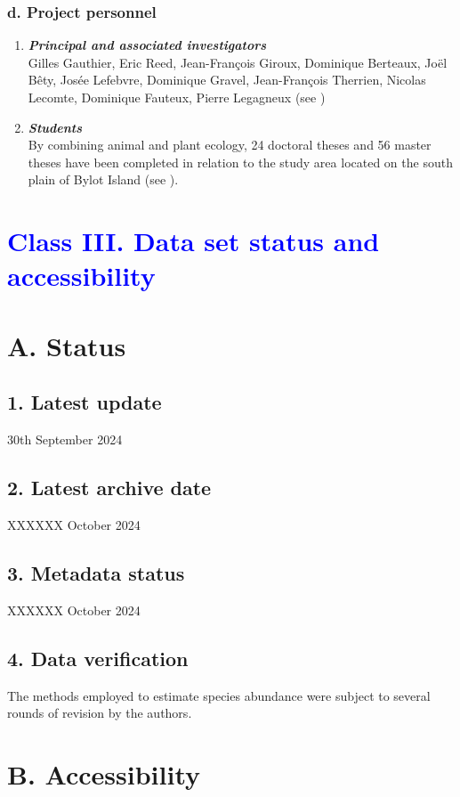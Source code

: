 \documentclass[a4paper,twoside,12pt]{article}
\begin{document}
                \subsubsection*{d. Project personnel}
                \begin{enumerate}[label=\alph*.]
                        \item[] \textit{\textbf{Principal and associated investigators}}\\
                        Gilles Gauthier, Eric Reed, Jean-François Giroux, Dominique Berteaux, Joël Bêty, Josée Lefebvre, Dominique Gravel, Jean-François Therrien, Nicolas Lecomte, Dominique Fauteux, Pierre Legagneux (see \citet{gauthier2024b})
                        \item[] \textit{\textbf{Students}}\\
                        By combining animal and plant ecology, 24 doctoral theses and 56 master theses have been completed in relation to the study area located on the south plain of Bylot Island (see \citet{gauthier2024b}).
                \end{enumerate}
\newpage 
 \section*{\textcolor{Blue}{Class III. Data set status and accessibility}}
    \section*{A. Status}
                \subsection*{1. Latest update} 30th September 2024
        \subsection*{2. Latest archive date} XXXXXX October 2024
        \subsection*{3. Metadata status} XXXXXX October 2024
        \subsection*{4. Data verification} The methods employed to estimate species abundance were subject to several rounds of revision by the authors.
   \section*{B. Accessibility}
\end{document}
